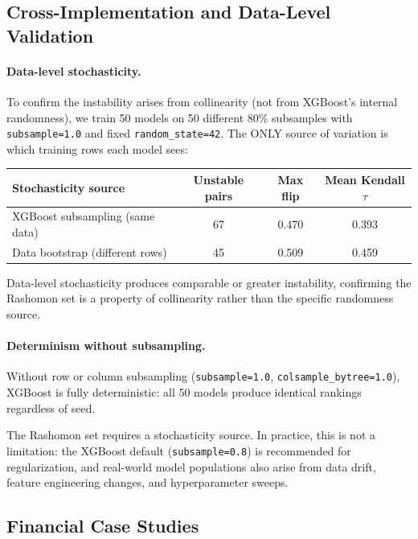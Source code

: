 \documentclass{jmlr}
\begin{document}
\subsection{Cross-Implementation and Data-Level Validation}

\paragraph{Data-level stochasticity.}
To confirm the instability arises from collinearity (not from XGBoost's internal randomness), we train 50 models on 50 different 80\% subsamples with \texttt{subsample=1.0} and fixed \texttt{random\_state=42}. The ONLY source of variation is which training rows each model sees:

\begin{center}
\small
\begin{tabular}{@{}lccc@{}}
\toprule
Stochasticity source & Unstable pairs & Max flip & Mean Kendall $\tau$ \\
\midrule
XGBoost subsampling (same data) & 67 & 0.470 & 0.393 \\
Data bootstrap (different rows) & 45 & 0.509 & 0.459 \\
\bottomrule
\end{tabular}
\end{center}

\begin{sloppypar}
Data-level stochasticity produces comparable or greater instability, confirming the Rashomon set is a property of collinearity rather than the specific randomness source.
\end{sloppypar}

\paragraph{Determinism without subsampling.}
\begin{sloppypar}
Without row or column subsampling (\texttt{subsample=1.0}, \texttt{colsample\_bytree=1.0}), XGBoost is fully deterministic: all 50 models produce identical rankings regardless of seed.
\end{sloppypar}

The Rashomon set requires a stochasticity source.
In practice, this is not a limitation: the XGBoost default (\texttt{subsample=0.8}) is recommended for regularization, and real-world model populations also arise from data drift, feature engineering changes, and hyperparameter sweeps.

\subsection{Financial Case Studies}
\end{document}
